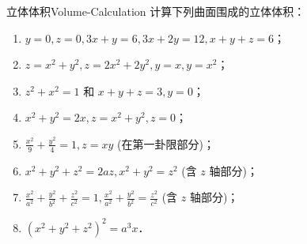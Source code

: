 \begin{problem}{立体体积}{Volume-Calculation}
    计算下列曲面围成的立体体积：
    \begin{enumerate}
        \item $y = 0, z = 0, 3x + y = 6, 3x + 2y = 12, x + y + z = 6$；
        \item $z = x^2 + y^2, z = 2x^2 + 2y^2, y = x, y = x^2$；
        \item $z^2 + x^2 = 1$ 和 $x + y + z = 3, y = 0$；
        \item $x^2 + y^2 = 2x, z = x^2 + y^2, z = 0$；
        \item $\frac{x^2}{9} + \frac{y^2}{4} = 1, z = xy$ (在第一卦限部分)；
        \item $x^2 + y^2 + z^2 = 2az, x^2 + y^2 = z^2$ (含 $z$ 轴部分)；
        \item $\frac{x^2}{a^2} + \frac{y^2}{b^2} + \frac{z^2}{c^2} = 1, \frac{x^2}{a^2} + \frac{y^2}{b^2} = \frac{z^2}{c^2}$ (含 $z$ 轴部分)；
        \item $(x^2 + y^2 + z^2)^2 = a^3 x$．
    \end{enumerate}
\end{problem}

